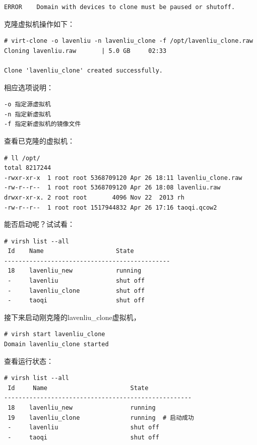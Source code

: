 \begin{verbatim}
ERROR    Domain with devices to clone must be paused or shutoff.
\end{verbatim}

克隆虚拟机操作如下：

\begin{verbatim}
# virt-clone -o lavenliu -n lavenliu_clone -f /opt/lavenliu_clone.raw
Cloning lavenliu.raw       | 5.0 GB     02:33     

Clone 'lavenliu_clone' created successfully.
\end{verbatim}

相应选项说明：

\begin{verbatim}
-o 指定源虚拟机
-n 指定新虚拟机
-f 指定新虚拟机的镜像文件
\end{verbatim}

查看已克隆的虚拟机：

\begin{verbatim}
# ll /opt/
total 8217244
-rwxr-xr-x  1 root root 5368709120 Apr 26 18:11 lavenliu_clone.raw
-rw-r--r--  1 root root 5368709120 Apr 26 18:08 lavenliu.raw
drwxr-xr-x. 2 root root       4096 Nov 22  2013 rh
-rw-r--r--  1 root root 1517944832 Apr 26 17:16 taoqi.qcow2
\end{verbatim}

能否启动呢？试试看：

\begin{verbatim}
# virsh list --all
 Id    Name                    State
----------------------------------------------
 18    lavenliu_new            running
 -     lavenliu                shut off
 -     lavenliu_clone          shut off
 -     taoqi                   shut off
\end{verbatim}

接下来启动刚克隆的lavenliu\_clone虚拟机，

\begin{verbatim}
# virsh start lavenliu_clone
Domain lavenliu_clone started
\end{verbatim}

查看运行状态：

\begin{verbatim}
# virsh list --all
 Id     Name                       State
----------------------------------------------------
 18    lavenliu_new                running
 19    lavenliu_clone              running  # 启动成功
 -     lavenliu                    shut off
 -     taoqi                       shut off
\end{verbatim}



